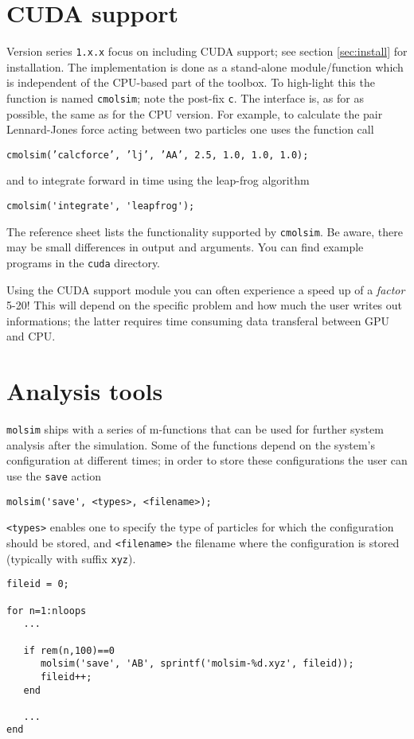 \documentclass[11pt]{article}
\begin{document}
\section{CUDA support}
Version series \verb!1.x.x! focus on including CUDA support; see section \ref{sec:install} for installation. 
The implementation is done as a stand-alone module/function which is independent of the CPU-based part 
of the toolbox. To high-light this the function is named \verb!cmolsim!; note the post-fix \verb!c!. The interface 
is, as for as possible, the same as for the CPU version. For example, to calculate the pair Lennard-Jones 
force acting between two particles one uses the function call
\begin{verbatim}
cmolsim(’calcforce’, ’lj’, ’AA’, 2.5, 1.0, 1.0, 1.0);
\end{verbatim}
and to integrate forward in time using the leap-frog algorithm 
\begin{verbatim}
cmolsim('integrate', 'leapfrog');
\end{verbatim}
The reference sheet lists the functionality supported by \verb!cmolsim!. Be aware, there may be small differences in 
output and arguments. You can find example programs in the \verb!cuda! directory. 
\bigskip

\noindent Using the CUDA support module you can often experience a speed up of a \emph{factor} 5-20! This will depend
on the specific problem and how much the user writes out informations; the latter requires time consuming data 
transferal between GPU and CPU. 

\iffalse
\section{Analysis tools} 
\verb!molsim! ships with a series of m-functions that can be used
for further system analysis after the simulation. Some of the functions depend on the
system's configuration at different times; in order to store these configurations the user can
use the \verb!save! action
\begin{verbatim}
molsim('save', <types>, <filename>); 
\end{verbatim}
\verb!<types>! enables one to specify the type of particles for which the configuration
should be stored, and \verb!<filename>! the filename where the
configuration is stored (typically with suffix \verb!xyz!). 

\begin{verbatim}
fileid = 0;

for n=1:nloops
   ...

   if rem(n,100)==0
      molsim('save', 'AB', sprintf('molsim-%d.xyz', fileid));
      fileid++;
   end

   ...
end
\end{verbatim}
\end{document}
